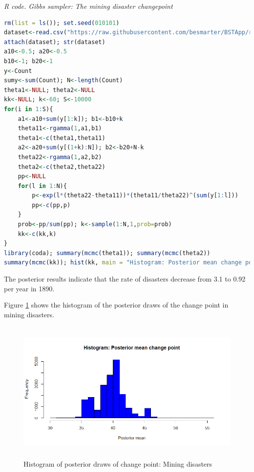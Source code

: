 \begin{tcolorbox}[enhanced,width=4.67in,center upper,
	fontupper=\large\bfseries,drop shadow southwest,sharp corners]
	\textit{R code. Gibbs sampler: The mining disaster changepoint}
	\begin{VF}
		\begin{lstlisting}[language=R]
rm(list = ls()); set.seed(010101)
dataset<-read.csv("https://raw.githubusercontent.com/besmarter/BSTApp/refs/heads/master/DataApp/MiningDataCarlin.csv",header=T)
attach(dataset); str(dataset)
a10<-0.5; a20<-0.5
b10<-1; b20<-1
y<-Count
sumy<-sum(Count); N<-length(Count)
theta1<-NULL; theta2<-NULL
kk<-NULL; k<-60; S<-10000
for(i in 1:S){
	a1<-a10+sum(y[1:k]); b1<-b10+k
	theta11<-rgamma(1,a1,b1)
	theta1<-c(theta1,theta11)
	a2<-a20+sum(y[(1+k):N]); b2<-b20+N-k
	theta22<-rgamma(1,a2,b2)
	theta2<-c(theta2,theta22)
	pp<-NULL
	for(l in 1:N){
		p<-exp(l*(theta22-theta11))*(theta11/theta22)^(sum(y[1:l]))
		pp<-c(pp,p)
	}
	prob<-pp/sum(pp); k<-sample(1:N,1,prob=prob)
	kk<-c(kk,k)
}
library(coda); summary(mcmc(theta1)); summary(mcmc(theta2))
summary(mcmc(kk)); hist(kk, main = "Histogram: Posterior mean change point", xlab = "Posterior mean", col = "blue", breaks = 25)
\end{lstlisting}
	\end{VF}
\end{tcolorbox} 

The posterior results indicate that the rate of disasters decrease from 3.1 to 0.92 per year in 1890. 

Figure \ref{fig52} shows the histogram of the posterior draws of the change point in mining disasters. 

\begin{figure}[!h]
	\includegraphics[width=340pt, height=200pt]{Chapters/chapter5/figures/Mining.png}
	\caption[List of figure caption goes here]{Histogram of posterior draws of change point: Mining disasters}\label{fig52}
\end{figure} 

